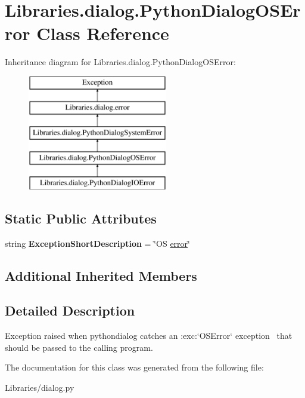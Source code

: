 \hypertarget{class_libraries_1_1dialog_1_1_python_dialog_o_s_error}{}\section{Libraries.\+dialog.\+Python\+Dialog\+O\+S\+Error Class Reference}
\label{class_libraries_1_1dialog_1_1_python_dialog_o_s_error}
Inheritance diagram for Libraries.\+dialog.\+Python\+Dialog\+O\+S\+Error\+:\begin{figure}[H]
\begin{center}
\leavevmode
\includegraphics[height=5.000000cm]{class_libraries_1_1dialog_1_1_python_dialog_o_s_error}
\end{center}
\end{figure}
\subsection*{Static Public Attributes}
\begin{DoxyCompactItemize}
\item 
string {\bfseries Exception\+Short\+Description} = \char`\"{}OS \hyperlink{class_libraries_1_1dialog_1_1error}{error}\char`\"{}\hypertarget{class_libraries_1_1dialog_1_1_python_dialog_o_s_error_ad5e27b40d843a701e5e39bbed02c221a}{}\label{class_libraries_1_1dialog_1_1_python_dialog_o_s_error_ad5e27b40d843a701e5e39bbed02c221a}

\end{DoxyCompactItemize}
\subsection*{Additional Inherited Members}


\subsection{Detailed Description}
\begin{DoxyVerb}Exception raised when pythondialog catches an :exc:`OSError` exception \
that should be passed to the calling program.\end{DoxyVerb}
 

The documentation for this class was generated from the following file\+:\begin{DoxyCompactItemize}
\item 
Libraries/dialog.\+py\end{DoxyCompactItemize}

